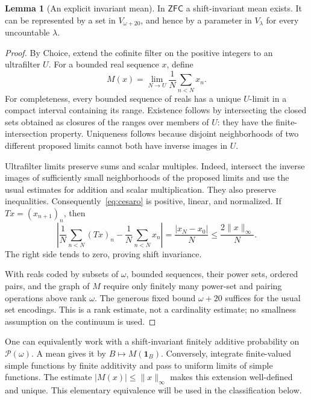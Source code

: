 \documentclass[11pt,letterpaper]{article}
\theoremstyle{definition}
\newtheorem{lemma}[definition]{Lemma}
\newcommand{\ZFC}{\mathsf{ZFC}}
\newcommand{\Pow}{\mathcal P}
\newcommand{\ind}{\mathbf 1}
\begin{document}
\begin{lemma}[An explicit invariant mean]\label{lem:mean}
In $\ZFC$ a shift-invariant mean exists. It can be represented by a set in $V_{\omega+20}$, and hence by a parameter in $V_\lambda$ for every uncountable $\lambda$.
\end{lemma}

\begin{proof}
By Choice, extend the cofinite filter on the positive integers to an ultrafilter $U$. For a bounded real sequence $x$, define
\begin{equation}\label{eq:cesaro}
 M(x)=\lim_{N\to U}\frac1N\sum_{n<N}x_n.
\end{equation}
For completeness, every bounded sequence of reals has a unique $U$-limit in a compact interval containing its range. Existence follows by intersecting the closed sets obtained as closures of the ranges over members of $U$: they have the finite-intersection property. Uniqueness follows because disjoint neighborhoods of two different proposed limits cannot both have inverse images in $U$.

Ultrafilter limits preserve sums and scalar multiples. Indeed, intersect the inverse images of sufficiently small neighborhoods of the proposed limits and use the usual estimates for addition and scalar multiplication. They also preserve inequalities. Consequently~\eqref{eq:cesaro} is positive, linear, and normalized. If $Tx=(x_{n+1})_n$, then
\[
 \left|\frac1N\sum_{n<N}(Tx)_n-\frac1N\sum_{n<N}x_n\right|
 =\frac{|x_N-x_0|}{N}\le\frac{2\|x\|_\infty}{N}.
\]
The right side tends to zero, proving shift invariance.

With reals coded by subsets of $\omega$, bounded sequences, their power sets, ordered pairs, and the graph of $M$ require only finitely many power-set and pairing operations above rank $\omega$. The generous fixed bound $\omega+20$ suffices for the usual set encodings. This is a rank estimate, not a cardinality estimate; no smallness assumption on the continuum is used.
\end{proof}

One can equivalently work with a shift-invariant finitely additive probability on $\Pow(\omega)$. A mean gives it by $B\mapsto M(\ind_B)$. Conversely, integrate finite-valued simple functions by finite additivity and pass to uniform limits of simple functions. The estimate $|M(x)|\le\|x\|_\infty$ makes this extension well-defined and unique. This elementary equivalence will be used in the classification below.
\end{document}
